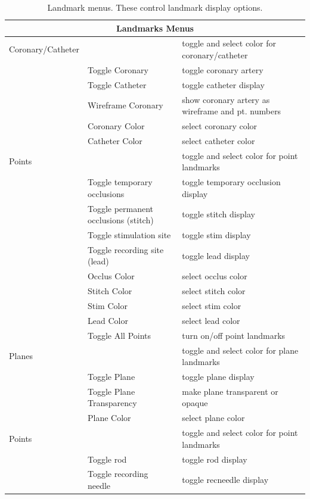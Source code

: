 \begin{table}[ht]
\caption{\label{table:landmarks} Landmark menus.  These control landmark
    display options.} 
  \begin{center}
    \begin{tabular}{|l|p{1.5in}|p{3 in}|} \hline
      \multicolumn{3}{|c|}{\textbf{Landmarks Menus}} \\ \hline
    Coronary/Catheter & & toggle and select color for coronary/catheter\\
    & Toggle Coronary & toggle coronary artery \\
    & Toggle Catheter & toggle catheter display \\ 
    & Wireframe Coronary & show coronary artery as wireframe and pt. numbers\\
    & Coronary Color & select coronary color \\
    & Catheter Color & select catheter color \\ \hline
    Points & & toggle and select color for point landmarks\\
    & Toggle temporary occlusions & toggle temporary occlusion display\\
    & Toggle permanent occlusions (stitch) & toggle stitch display \\ 
    & Toggle stimulation site & toggle stim display \\ 
    & Toggle recording site (lead) & toggle lead display \\ 
    & Occlus Color & select occlus color \\
    & Stitch Color & select stitch color \\
    & Stim Color & select stim color \\
    & Lead Color & select lead color \\
    & Toggle All Points & turn on/off point landmarks \\ \hline
    Planes & & toggle and select color for plane landmarks \\
    & Toggle Plane & toggle plane display \\
    & Toggle Plane Transparency & make plane transparent or opaque \\
    & Plane Color & select plane color \\ \hline
    Points & & toggle and select color for point landmarks \\
    & Toggle rod & toggle rod display\\
    & Toggle recording needle & toggle recneedle display \\ 

\end{tabular}
\end{center}
\end{table}
